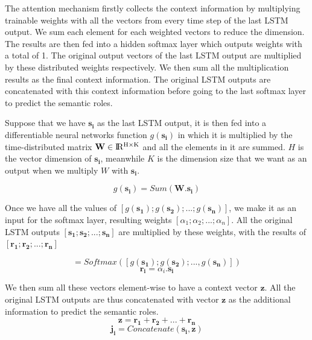 The attention mechanism firstly collects the context information by multiplying trainable weights with all the vectors from every time step of the last LSTM output. We sum each element for each weighted vectors to reduce the dimension. The results are then fed into a hidden softmax layer which outputs weights with a total of 1. The original output vectors of the last LSTM output are multiplied by these distributed weights respectively. We then sum all the multiplication results as the final context information. The original LSTM outputs are concatenated with this context information before going to the last softmax layer to predict the semantic roles. 

Suppose that we have $\mathbf{s_{i}}$ as the last LSTM output, it is then fed into a differentiable neural networks function $g(\mathbf{s_{i}})$ in which it is multiplied by the time-distributed matrix $\textbf{W} \in {\rm I\!R^{H \times K}}$ and all the elements in it are summed. $H$ is the vector dimension of $\mathbf{s_{i}}$, meanwhile $K$ is the dimension size that we want as an output when we multiply \textbf{$W$} with $\mathbf{s_{i}}$.

\begin{equation}
\label{sum_weight}
g(\mathbf{s_{i}}) = Sum(\mathbf{W}.\mathbf{s_{i}})
\end{equation}

Once we have all the values of $[g(\mathbf{s_{1}}); g(\mathbf{s_{2}}); ...; g(\mathbf{s_{n}})]$, we make it as an input for the softmax layer, resulting weights $[\alpha_{1}; \alpha_{2}; ...; \alpha_{n}]$. All the original LSTM outputs $[\mathbf{s_{1}}; \mathbf{s_{2}}; ...; \mathbf{s_{n}}]$ are multiplied by these weights, with the results of $[\mathbf{r_{1}}; \mathbf{r_{2}}; ...; \mathbf{r_{n}}]$

\begin{equation}
[\alpha_{1}; \alpha_{2}; ...; \alpha_{n}] = Softmax([g(\mathbf{s_{1}}); g(\mathbf{s_{2}}); ..., g(\mathbf{s_{n}})])
\end{equation}
\begin{equation}
\mathbf{r_{i}} = \alpha_{i}.\mathbf{s_{i}}
\end{equation}

We then sum all these vectors element-wise to have a context vector $\mathbf{z}$. 
All the original LSTM outputs are thus concatenated with vector $\mathbf{z}$ as the additional information to predict the semantic roles.
\begin{equation}
\mathbf{z} = \mathbf{r_{1}} + \mathbf{r_{2}} + ... + \mathbf{r_{n}}
\end{equation}
\begin{equation}
\mathbf{j_{i}} = Concatenate(\mathbf{s_{i}}, \mathbf{z})
\end{equation}


